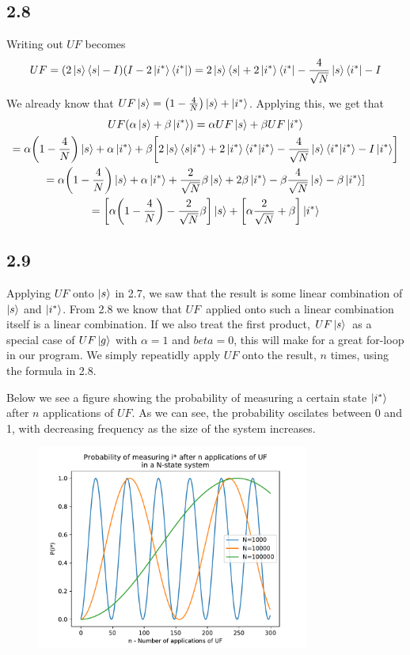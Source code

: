 \documentclass[12p,a4paper]{article}
\newcommand{\0}{\ket{0}}
\newcommand{\1}{\ket{1}}
\begin{document}
\subsection*{2.8}Writing out $UF$ becomes
\begin{align*}
    UF = (2\ket{s}\bra{s} - I)(I - 2\ket{i^*}\bra{i^*}) = 2\ket{s}\bra{s} + 2\ket{i^*}\bra{i^*} - \frac{4}{\sqrt{N}}\ket{s}\bra{i^*} - I
\end{align*}

We already know that $UF\ket{s} = \qty(1 - \frac{4}{N})\ket{s} + \ket{i^*}$. Applying this, we get that
\begin{gather*}
    UF(\alpha\ket{s} + \beta\ket{i^*}) = \alpha UF\ket{s} + \beta UF\ket{i^*}\\
    = \alpha\qty(1 - \frac{4}{N})\ket{s} + \alpha\ket{i^*} + \beta\qty[2\ket{s}\bra{s}\ket{i^*} + 2\ket{i^*}\bra{i^*}\ket{i^*} - \frac{4}{\sqrt{N}}\ket{s}\bra{i^*}\ket{i^*} - I\ket{i^*}]\\
    = \alpha\qty(1 - \frac{4}{N})\ket{s} + \alpha\ket{i^*} + \frac{2}{\sqrt{N}}\beta\ket{s} + 2\beta\ket{i^*} - \beta\frac{4}{\sqrt{N}}\ket{s} - \beta\ket{i^*}]\\
    = \qty[\alpha\qty(1-\frac{4}{N}) - \frac{2}{\sqrt{N}}\beta]\ket{s} + \qty[\alpha\frac{2}{\sqrt{N}} + \beta]\ket{i^*}
\end{gather*}



\subsection*{2.9}
Applying $UF$ onto $\ket{s}$ in 2.7, we saw that the result is some linear combination of $\ket{s}$ and $\ket{i^*}$. From 2.8 we know that $UF$ applied onto such a linear combination itself is a linear combination. If we also treat the first product, $UF\ket{s}$ as a special case of $UF\ket{g}$ with $\alpha = 1$ and $beta=0$, this will make for a great for-loop in our program. We simply repeatidly apply $UF$ onto the result, $n$ times, using the formula in 2.8.

Below we see a figure showing the probability of measuring a certain state $\ket{i^*}$ after $n$ applications of $UF$. As we can see, the probability oscilates between 0 and 1, with decreasing frequency as the size of the system increases.
\begin{figure}[H]
    \centering
    \includegraphics[width=0.8\textwidth]{three_Ns.pdf}
\end{figure}
\end{document}
